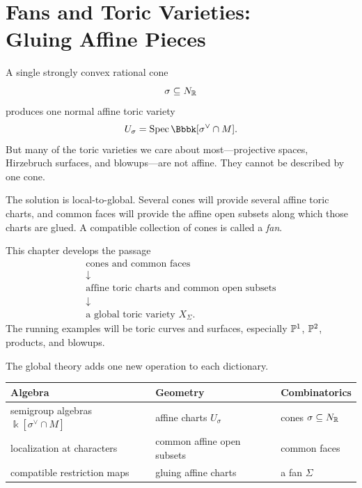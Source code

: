 \chapter[Fans and Toric Varieties]
{Fans and Toric Varieties:\\ Gluing Affine Pieces}
\label{chap:fans-and-toric-varieties}

\begin{chapteroverview}
A single strongly convex rational cone
\[
\sigma\subseteq N_{\mathbb{R}}
\]
produces one normal affine toric variety
\[
U_\sigma
=
\Spec\Bbbk[\sigma^\vee\cap M].
\]
But many of the toric varieties we care about most—projective spaces,
Hirzebruch surfaces, and blowups—are not affine. They cannot be
described by one cone.

The solution is local-to-global. Several cones will provide several
affine toric charts, and common faces will provide the affine open
subsets along which those charts are glued. A compatible collection
of cones is called a \emph{fan}.

This chapter develops the passage
\[
\begin{array}{c}
\text{cones and common faces}
\\[-1mm]
\downarrow
\\[-1mm]
\text{affine toric charts and common open subsets}
\\[-1mm]
\downarrow
\\[-1mm]
\text{a global toric variety }X_\Sigma.
\end{array}
\]
The running examples will be toric curves and surfaces, especially
\(\mathbb{P}^1\), \(\mathbb{P}^2\), products, and blowups.
\end{chapteroverview}

\begin{threedictionaries}
The global theory adds one new operation to each dictionary.

\medskip

\begin{center}
\small
\begin{tabularx}{\linewidth}{@{}
  >{\raggedright\arraybackslash}X
  >{\raggedright\arraybackslash}X
  >{\raggedright\arraybackslash}X@{}}
\toprule
\textbf{Algebra}
&
\textbf{Geometry}
&
\textbf{Combinatorics}
\\
\midrule
semigroup algebras
\(\Bbbk[\sigma^\vee\cap M]\)
&
affine charts \(U_\sigma\)
&
cones \(\sigma\subseteq N_{\mathbb{R}}\)
\\[1mm]
localization at characters
&
common affine open subsets
&
common faces
\\[1mm]
compatible restriction maps
&
gluing affine charts
&
a fan \(\Sigma\)
\\
\bottomrule
\end{tabularx}
\end{center}
\end{threedictionaries}

